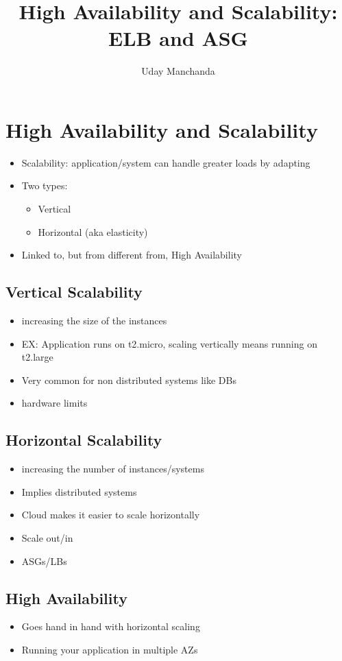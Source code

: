 \documentclass[]{scrartcl}
\title{High Availability and Scalability: ELB and ASG}
\author{Uday Manchanda}
\begin{document}
\maketitle

\section{High Availability and Scalability}
\begin{itemize}
	\item Scalability: application/system can handle greater loads by adapting
	\item Two types:
	\begin{itemize}
		\item Vertical
		\item Horizontal (aka elasticity)
	\end{itemize}
	\item Linked to, but from different from, High Availability
\end{itemize}

\subsection{Vertical Scalability}
\begin{itemize}
	\item increasing the size of the instances
	\item EX: Application runs on t2.micro, scaling vertically means running on t2.large
	\item Very common for non distributed systems like DBs
	\item hardware limits
\end{itemize}

\subsection{Horizontal Scalability}
\begin{itemize}
	\item increasing the number of instances/systems
	\item Implies distributed systems
	\item Cloud makes it easier to scale horizontally
	\item Scale out/in
	\item ASGs/LBs
\end{itemize}

\subsection{High Availability}
\begin{itemize}
	\item Goes hand in hand with horizontal scaling
	\item Running your application in multiple AZs
\end{itemize}
\end{document}
